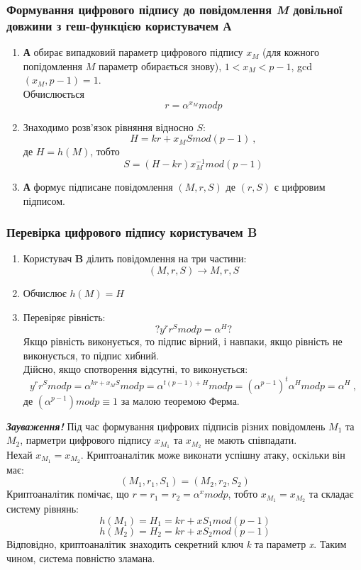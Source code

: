 \subsubsection*{Формування цифрового підпису до повідомлення \textit{M} довільної довжини з геш-функцією користувачем \textbf{А}}
\begin{enumerate}
\item \textbf{А} обирає випадковий параметр цифрового підпису \textit{$x_M$} (для кожного попідомлення \textit{$M$} параметр обирається знову), $1<x_M<p-1$, gcd$(x_M,p-1)=1$.\\
 Обчислюється $$r=\alpha^{x_M}mod p$$
\item Знаходимо розв'язок рівняння відносно \textit{$S$}: $$H=kr+x_{M}Smod(p-1) \: ,$$ 
де $H=h(M)$, тобто $$S=(H-kr)x^{-1}_{M}mod (p-1)$$ 
\item \textbf{А} формує підписане повідомлення \textit{$(M,r,S)$} де \textit{$(r,S)$} є цифровим підписом.
\end{enumerate}
\subsubsection*{Перевірка цифрового підпису користувачем \textbf{B}}
\begin{enumerate}
\item Користувач \textbf{B} ділить повідомлення на три частини:$$(M,r,S)\rightarrow M,r,S$$
\item Обчислює \textit{$h(M)=H$}
\item Перевіряє рівність: $$?y^rr^Smodp=\alpha^H?$$
Якщо рівність виконується, то підпис вірний, і навпаки, якщо рівність не виконується, то підпис хибний.\\
Дійсно, якщо спотворення відсутні, то виконується: $$y^rr^Smodp=\alpha^{kr+x_{M}S}modp=\alpha^{t(p-1)+H}modp=(\alpha^{p-1})^t\alpha^{H}modp=\alpha^{H} \: ,$$
де $(\alpha^{p-1})modp\equiv1$ за малою теоремою Ферма.
\end{enumerate}
\textit{\textbf{Зауваження!}} Під час формування цифрових підписів різних повідомлень \textit{$M_1$} та \textit{$M_2$}, парметри цифрового підпису \textit{$x_{M_1}$} та \textit{$x_{M_2}$} не мають співпадати.\\
Нехай \textit{$x_{M_1}=x_{M_2}$}. Криптоаналітик може виконати успішну атаку, оскільки він має: $$(M_1,r_1,S_1)=(M_2,r_2,S_2)$$
Криптоаналітик помічає, що \textit{$r=r_1=r_2=\alpha^{x}modp$}, тобто \textit{$x_{M_1}=x_{M_2}$} та складає систему рівнянь:
$$h(M_1)=H_1=kr+xS_1mod(p-1)$$
$$h(M_2)=H_2=kr+xS_2mod(p-1)$$
Відповідно, криптоаналітик знаходить секретний ключ \textit{k} та параметр \textit{x}. Таким чином, система повністю зламана.
